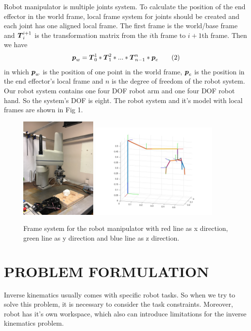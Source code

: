 \documentclass[journal,comsoc]{IEEEtran}
\begin{document}
Robot manipulator is multiple joints system.  To calculate the position of the end effector in the world frame, local frame system for joints should be created and each joint has one aligned local frame.
 The first frame is the world/base frame and $\mbox{\boldmath $T$}_i^{i+1}$ is the transformation matrix from the $i$th frame to $i+1$th frame.  Then we have 
\[
\mbox{\boldmath $p$}_w = \mbox{\boldmath $T$}_0^1*\mbox{\boldmath $T$}_1^2*... *\mbox{\boldmath $T$}_{n-1}^n * \mbox{\boldmath $p$}_e \tag{2}
\]
 in which $\mbox{\boldmath $p$}_w$ is the position of one point in the world frame, $\mbox{\boldmath $p$}_e$ is the position in the end effector's local frame and $n$ is the degree of freedom of the robot system.\\

Our robot system contains one four DOF robot arm and one four DOF robot hand. So the system's DOF is eight. The robot system and it's model with local frames are shown in Fig 1. 
 
\begin{figure}[!t]
\centering
\includegraphics[width=1.5in, height=2.0in]{IMG_5860.jpg}
\includegraphics[width=2.5in]{frames.jpg}
\caption{Frame system for the robot manipulator with red line as x direction, green line as y direction and blue line as z direction. }
\label{fig_sim }
\end{figure}

\section{PROBLEM FORMULATION}
Inverse kinematics usually comes with  specific robot tasks.  So when we try to solve this problem, it is necessary to consider the task constraints. Moreover, robot has it's own workspace, which also can introduce limitations for the inverse kinematics problem. \\ 
\end{document}
